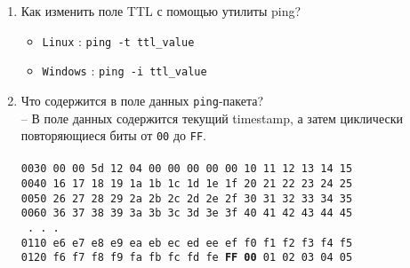 \documentclass[12pt, a4paper]{article}
\begin{document}
\begin{enumerate}
  \item Как изменить поле TTL с помощью утилиты ping?\\
    \begin{itemize}
      \item \texttt{Linux} : \texttt{ping -t ttl\_value}
      \item \texttt{Windows} : \texttt{ping -i ttl\_value}
    \end{itemize}
  \item Что содержится в поле данных \texttt{ping}-пакета?\\
    -- В поле данных содержится текущий timestamp, а затем циклически
    повторяющиеся биты от \texttt{00} до \texttt{FF}.\\ \\
    \texttt{0030   00 00 5d 12 04 00 00 00 00 00 10 11 12 13 14 15}\\
    \texttt{0040   16 17 18 19 1a 1b 1c 1d 1e 1f 20 21 22 23 24 25}\\
    \texttt{0050   26 27 28 29 2a 2b 2c 2d 2e 2f 30 31 32 33 34 35}\\
    \texttt{0060   36 37 38 39 3a 3b 3c 3d 3e 3f 40 41 42 43 44 45}\\
    \texttt{                    .       .       .                 }\\
    \texttt{0110   e6 e7 e8 e9 ea eb ec ed ee ef f0 f1 f2 f3 f4 f5}\\
    \texttt{0120   f6 f7 f8 f9 fa fb fc fd fe \textbf{FF 00} 01 02 03 04 05}\\
\end{enumerate}

\end{document}
